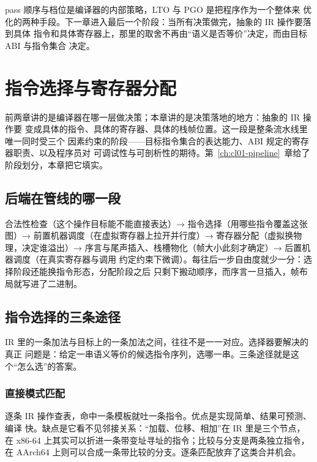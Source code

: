 \documentclass[12pt,a4paper,fontset=fandol]{ctexbook}
\newcommand{\Mx}[1]{\textsf{#1}}
\newcommand{\xSixtyFour}{\textsf{x86-64}}
\newcommand{\ArmSixtyFour}{\textsf{AArch64}}
\begin{document}
\Mx{pass} 顺序与档位是编译器的内部策略，\Mx{LTO} 与 \Mx{PGO} 是把程序作为一个整体来
优化的两种手段。下一章进入最后一个阶段：当所有决策做完，抽象的 \Mx{IR} 操作要落到具体
指令和具体寄存器上，那里的取舍不再由“语义是否等价”决定，而由目标 \Mx{ABI} 与指令集合
决定。

\chapter{指令选择与寄存器分配}\label{ch:cl06-codegen}

前两章讲的是编译器在哪一层做决策；本章讲的是决策落地的地方：抽象的 \Mx{IR} 操作要
变成具体的指令、具体的寄存器、具体的栈帧位置。这一段是整条流水线里唯一同时受三个
因素约束的阶段——目标指令集合的表达能力、\Mx{ABI} 规定的寄存器职责、以及程序员对
可调试性与可剖析性的期待。第~\ref{ch:cl01-pipeline}~章给了阶段划分，本章把它填实。

\section{后端在管线的哪一段}\label{sec:cl06-stage}

\begin{flow}[title={从 IR 到可提交汇编的六步}]
合法性检查（这个操作目标能不能直接表达）→ 指令选择（用哪些指令覆盖这张图）→
前置机器调度（在虚拟寄存器上拉开并行度）→ 寄存器分配（虚拟换物理，决定谁溢出）→
序言与尾声插入、栈槽物化（帧大小此刻才确定）→ 后置机器调度（在真实寄存器与调用
约定约束下微调）。每往后一步自由度就少一分：选择阶段还能换指令形态，分配阶段之后
只剩下搬动顺序，而序言一旦插入，帧布局就写进了二进制。
\end{flow}

\section{指令选择的三条途径}\label{sec:cl06-isel}

\Mx{IR} 里的一条加法与目标上的一条加法之间，往往不是一一对应。选择器要解决的真正
问题是：给定一串语义等价的候选指令序列，选哪一串。三条途径就是这个“怎么选”的答案。

\subsection{直接模式匹配}\label{sec:cl06-match}

逐条 \Mx{IR} 操作查表，命中一条模板就吐一条指令。优点是实现简单、结果可预测、编译
快。缺点是它看不见邻接关系：“加载、位移、相加”在 \Mx{IR} 里是三个节点，在
\xSixtyFour{} 上其实可以折进一条带变址寻址的指令；比较与分支是两条独立指令，在
\ArmSixtyFour{} 上则可以合成一条带比较的分支。逐条匹配放弃了这类合并机会。
\end{document}
